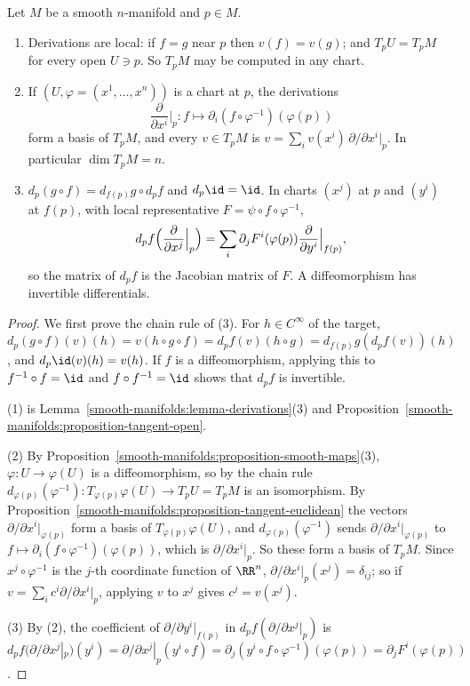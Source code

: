 \begin{proposition}\label{smooth-manifolds:proposition-tangent-space}
Let $M$ be a smooth $n$-manifold and $p \in M$.
\begin{enumerate}
\item Derivations are local: if $f = g$ near $p$ then $v(f) = v(g)$; and $T_pU = T_pM$ for every open $U \ni p$. So $T_pM$ may be computed in any chart.
\item If $(U, \varphi = (x^1, \ldots, x^n))$ is a chart at $p$, the derivations
\[
\frac{\partial}{\partial x^i}\Big|_p \colon f \mapsto \partial_i(f \circ \varphi^{-1})(\varphi(p))
\]
form a basis of $T_pM$, and every $v \in T_pM$ is $v = \sum_iv(x^i)\,\partial/\partial x^i|_p$. In particular $\dim T_pM = n$.
\item $d_p(g \circ f) = d_{f(p)}g \circ d_pf$ and $d_p\id = \id$. In charts $(x^j)$ at $p$ and $(y^i)$ at $f(p)$, with local representative
$F = \psi \circ f \circ \varphi^{-1}$,
\[
d_pf\Bigl(\frac{\partial}{\partial x^j}\Big|_p\Bigr) = \sum_i\partial_jF^i(\varphi(p))\frac{\partial}{\partial y^i}\Big|_{f(p)},
\]
so the matrix of $d_pf$ is the Jacobian matrix of $F$. A diffeomorphism has invertible differentials.
\end{enumerate}
\end{proposition}

\begin{proof}
We first prove the chain rule of (3). For $h \in C^\infty$ of the target, $d_p(g \circ f)(v)(h) = v(h \circ g \circ f) = d_pf(v)(h \circ g) =
d_{f(p)}g(d_pf(v))(h)$, and $d_p\id(v)(h) = v(h)$. If $f$ is a diffeomorphism, applying this to $f^{-1} \circ f = \id$ and $f \circ f^{-1} = \id$ shows that
$d_pf$ is invertible.

(1) is Lemma~\ref{smooth-manifolds:lemma-derivations}(3) and Proposition~\ref{smooth-manifolds:proposition-tangent-open}.

(2) By Proposition~\ref{smooth-manifolds:proposition-smooth-maps}(3), $\varphi \colon U \to \varphi(U)$ is a diffeomorphism, so by the chain rule
$d_{\varphi(p)}(\varphi^{-1}) \colon T_{\varphi(p)}\varphi(U) \to T_pU = T_pM$ is an isomorphism. By
Proposition~\ref{smooth-manifolds:proposition-tangent-euclidean} the vectors $\partial/\partial x^i|_{\varphi(p)}$ form a basis of $T_{\varphi(p)}\varphi(U)$, and
$d_{\varphi(p)}(\varphi^{-1})$ sends $\partial/\partial x^i|_{\varphi(p)}$ to $f \mapsto \partial_i(f \circ \varphi^{-1})(\varphi(p))$, which is
$\partial/\partial x^i|_p$. So these form a basis of $T_pM$. Since $x^j \circ \varphi^{-1}$ is the $j$-th coordinate function of $\RR^n$,
$\partial/\partial x^i|_p(x^j) = \delta_{ij}$; so if $v = \sum_ic^i\partial/\partial x^i|_p$, applying $v$ to $x^j$ gives $c^j = v(x^j)$.

(3) By (2), the coefficient of $\partial/\partial y^i|_{f(p)}$ in $d_pf(\partial/\partial x^j|_p)$ is
$d_pf(\partial/\partial x^j|_p)(y^i) = \partial/\partial x^j|_p(y^i \circ f) = \partial_j(y^i \circ f \circ \varphi^{-1})(\varphi(p)) = \partial_jF^i(\varphi(p))$.
\end{proof}

